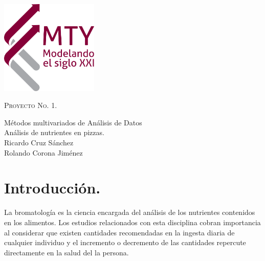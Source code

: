 \documentclass[12pt, letterpaper]{article}
\begin{document}
\begin{minipage}[c][0.6\textheight][t]{0.2\textwidth}
\begin{center}
\hskip2pt
\vrule width2.5pt height10cm
        \hskip1mm
        \vrule width1pt height10cm \\ \vspace{2cm}
        \includegraphics[height=4.5cm]{mty}
        \end{center}
\end{minipage}
\begin{minipage}[c][0.9\textheight][t]{0.65\textwidth}
  \begin{center}

	
    \vspace{3.2cm}
    

  \scshape Proyecto No. 1.\\ \normalsize
  
  \vspace{2cm}  
  
    
            
    Métodos multivariados de Análisis de Datos\\
    \vspace{1cm}   
    Análisis de nutrientes en pizzas.\\
    \vspace{1cm}   
    \vspace{1cm}   
    Ricardo Cruz Sánchez\\
    Rolando Corona Jiménez
    \vspace{.5cm}   
  \end{center}
  
\end{minipage}

\pagebreak
\tableofcontents

\cleardoublepage
\pagebreak
\section{Introducción.}
La bromatología es la ciencia encargada del análisis de los nutrientes contenidos en los alimentos. Los estudios relacionados con esta disciplina cobran importancia al considerar que existen cantidades recomendadas en la ingesta diaria de cualquier individuo y el incremento o decremento de las cantidades repercute directamente en la salud del la persona.\\
\end{document}

